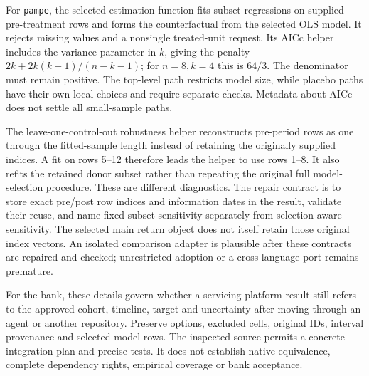 For \texttt{pampe}, the selected estimation function fits subset regressions on supplied pre-treatment rows and forms the
counterfactual from the selected OLS model. It rejects missing values and a nonsingle treated-unit request. Its AICc helper
includes the variance parameter in $k$, giving the penalty $2k+2k(k+1)/(n-k-1)$; for $n=8,k=4$ this is $64/3$.
The denominator must remain positive. The top-level path restricts model size, while placebo paths have their own local
choices and require separate checks. Metadata about AICc does not settle all small-sample paths.\citep{exec28_panel_delegates,exec28_panel_delegate_reference}

The leave-one-control-out robustness helper reconstructs pre-period rows as one through the fitted-sample length instead
of retaining the originally supplied indices. A fit on rows 5--12 therefore leads the helper to use rows 1--8. It also refits
the retained donor subset rather than repeating the original full model-selection procedure. These are different
diagnostics. The repair contract is to store exact pre/post row indices and information dates in the result, validate
their reuse, and name fixed-subset sensitivity separately from selection-aware sensitivity. The selected main return
object does not itself retain those original index vectors. An isolated comparison adapter is plausible after these
contracts are repaired and checked; unrestricted adoption or a cross-language port remains premature.
\citep{exec28_panel_delegates,exec28_panel_delegate_reference}

For the bank, these details govern whether a servicing-platform result still refers to the approved cohort, timeline,
target and uncertainty after moving through an agent or another repository. Preserve options, excluded cells, original
IDs, interval provenance and selected model rows. The inspected source permits a concrete integration plan and precise
tests. It does not establish native equivalence, complete dependency rights, empirical coverage or bank acceptance.
